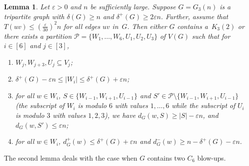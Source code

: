 \documentclass[11pt]{article}
\newtheorem{lemma}[theorem]{Lemma}
\newcommand{\eps}{\varepsilon}
\numberwithin{equation}{section}
\begin{document}
	\begin{lemma}\label{Lemma: 2 C_6 blow-ups}
		Let $\eps >0 $ and $n$ be sufficiently large.
		Suppose $G=G_3(n)$ is a tripartite graph with $\delta(G)\geq n$ and $\delta^+(G)\ge 2\eps n$. Further, assume that $T(uv)\le \left(\frac{\varepsilon}{30}\right)^2n$ for all edges $uv$ in~$G$. 
		Then either $G$ contains a~$K_3(2)$ or there exists 
		a partition $\mathcal{P}=\{W_1,\dots,W_6,U_1,U_2, U_3\}$ of $V(G)$ such that for $i\in [6]$ and $j\in [3]$,
		\begin{enumerate}[label = {\rm (\alph*)}]
			\item $W_j,W_{j+3},U_j \subseteq V_j$;
			\label{itm:C6:1}
			
			\item $\delta^+(G) -\eps n \leq |W_i| \le \delta^+(G) + \eps n$; \label{itm:C6:2a}	
			\item 		\label{itm:C6:3}		 for all $w\in W_i$, $S\in \{W_{i-1},W_{i+1},U_{i-1}\}$ and $S'\in \mathcal{P}\setminus \{W_{i-1},W_{i+1},U_{i-1}\}$ (the subscript of $W_i$ is modulo $6$ with values $1, \dots, 6$ while the subscript of $U_i$ is modulo $3$ with values $1,2, 3$), we have $d_G(w,S)\geq |S| - \eps n$, and $d_G(w,S') \le \eps n$;
			
			\item for all $w\in W_i$, $
			d_G^+(w) \leq \delta^+(G) + \eps n  $ and $ d_G^-(w) \ge n - \delta^+(G) - \eps n $.
			\label{itm:C6:4}
		\end{enumerate}
	\end{lemma}
	
The second lemma deals with the case when $G$ contains two $C_6$ blow-ups. 
	
\end{document}
